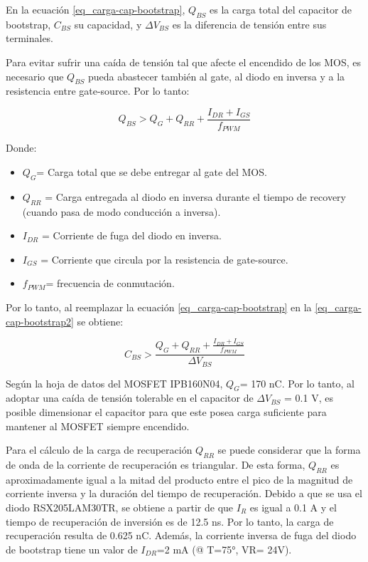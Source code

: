 \noindent En la ecuación \ref{eq_carga-cap-bootstrap}, $Q_{BS}$ es la carga total del capacitor de bootstrap, $C_{BS}$ su capacidad, y $\Delta V_{BS}$ es la diferencia de  tensión entre sus terminales. 

\noindent Para evitar sufrir una caída de tensión tal que afecte el encendido de los MOS, es necesario que $Q_{BS}$ pueda abastecer también al gate, al diodo en inversa y a la resistencia entre gate-source. Por lo tanto:

\begin{equation} \label{eq_carga-cap-bootstrap2}
Q_{BS} > Q_G + Q_{RR} + \frac{I_{DR}+I_{GS}}{f_{PWM}}
\end{equation}

\noindent Donde:
\begin{itemize}
\item $Q_G$= Carga total que se debe entregar al gate del MOS.
\item $Q_{RR}$ = Carga entregada al diodo en inversa durante el tiempo de recovery (cuando pasa de modo conducción a inversa).
\item $I_{DR}$ = Corriente de fuga del diodo en inversa.
\item $I_{GS}$ = Corriente que circula por la resistencia de gate-source.
\item $f_{PWM}$= frecuencia de conmutación.
\end{itemize}


\noindent Por lo tanto, al reemplazar la ecuación \ref{eq_carga-cap-bootstrap} en la \ref{eq_carga-cap-bootstrap2} se obtiene:


\begin{equation} \label{eq_cap-bootstrap}
C_{BS} > \frac{Q_G+Q_{RR} + \frac{I_{DR}+I_{GS}}{f_{PWM}}}{\Delta V_{BS}}
\end{equation}

\noindent Según la hoja de datos \cite{IPB160N04} del MOSFET IPB160N04, $Q_G$= 170 nC. Por lo tanto, al adoptar una caída de tensión tolerable en el capacitor de $\Delta V_{BS}$ = 0.1 V, es posible dimensionar el capacitor para que este posea carga suficiente para mantener al MOSFET siempre encendido.

\noindent Para el cálculo de la carga de recuperación $Q_{RR}$ se puede considerar que la forma de onda de la corriente de recuperación es triangular. De esta forma,  $Q_{RR}$ es aproximadamente igual a la mitad del producto entre el pico de la magnitud de corriente inversa y la duración del tiempo de recuperación.  Debido a que se usa el diodo RSX205LAM30TR, se obtiene a partir de \cite{RSX205LAM30} que  $I_R$ es igual a 0.1 A  y  el tiempo de recuperación de inversión es de 12.5 ns. Por lo tanto, la carga de recuperación resulta de 0.625 nC. Además, la corriente inversa de fuga del diodo de bootstrap tiene un valor de $I_{DR}$=2 mA (@ T=75°, VR= 24V).

